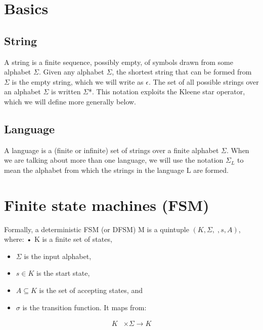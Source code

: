 \documentclass{article}
\begin{document}
% 
% 



\section{Basics}

\subsection{String}

A string is a finite sequence, possibly empty, of symbols drawn from some
alphabet $\Sigma$. Given any alphabet $\Sigma$, the shortest string that can be formed from $\Sigma$
is the empty string, which we will write as $\epsilon$. The set of all possible strings
over an alphabet $\Sigma$ is written $\Sigma$*. This notation exploits the Kleene star
operator, which we will define more generally below.

\subsection{Language}

A language is a (finite or infinite) set of strings over a finite alphabet $\Sigma$.
When we are talking about more than one language, we will use the notation $\Sigma_L$
to mean the alphabet from which the strings in the language L are formed.


\section{Finite state machines (FSM)}

Formally, a deterministic FSM (or DFSM) M is a quintuple $(K, \Sigma, , s, A)$,
where: • K is a finite set of states,

\begin{itemize} \item $\Sigma$ is the input alphabet, \item $s \in K$ is the
start state, \item $A \subseteq K$ is the set of accepting states, and \item
$\sigma$ is the transition function. It maps from: \end{itemize}


\begin{align*} K &\times \Sigma \to K \\ \end{align*}
\end{document}
